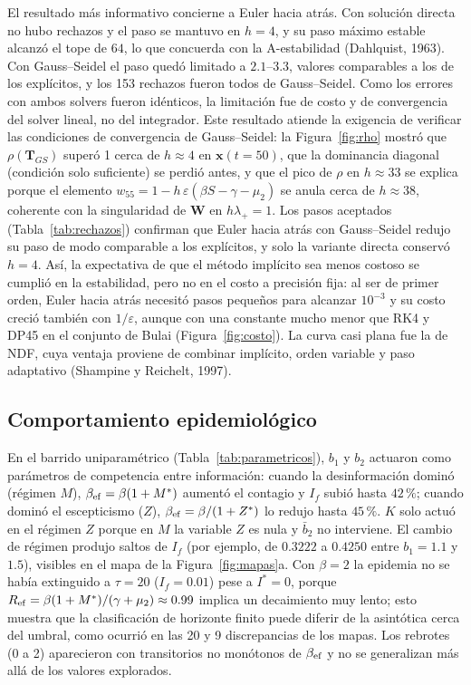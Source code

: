 El resultado más informativo concierne a Euler hacia atrás. Con solución directa no hubo rechazos y el paso se mantuvo en $h=4$, y su paso máximo estable alcanzó el tope de $64$, lo que concuerda con la A-estabilidad (Dahlquist, 1963). Con Gauss--Seidel el paso quedó limitado a $2.1$--$3.3$, valores comparables a los de los explícitos, y los 153 rechazos fueron todos de Gauss--Seidel. Como los errores con ambos solvers fueron idénticos, la limitación fue de costo y de convergencia del solver lineal, no del integrador. Este resultado atiende la exigencia de verificar las condiciones de convergencia de Gauss--Seidel: la Figura~\ref{fig:rho} mostró que $\rho(\mathbf T_{GS})$ superó 1 cerca de $h\approx4$ en $\mathbf x(t=50)$, que la dominancia diagonal (condición solo suficiente) se perdió antes, y que el pico de $\rho$ en $h\approx33$ se explica porque el elemento $w_{55}=1-h\,\varepsilon(\beta S-\gamma-\mu_2)$ se anula cerca de $h\approx38$, coherente con la singularidad de $\mathbf W$ en $h\lambda_+=1$. Los pasos aceptados (Tabla~\ref{tab:rechazos}) confirman que Euler hacia atrás con Gauss--Seidel redujo su paso de modo comparable a los explícitos, y solo la variante directa conservó $h=4$. Así, la expectativa de que el método implícito sea menos costoso se cumplió en la estabilidad, pero no en el costo a precisión fija: al ser de primer orden, Euler hacia atrás necesitó pasos pequeños para alcanzar $10^{-3}$ y su costo creció también con $1/\varepsilon$, aunque con una constante mucho menor que RK4 y DP45 en el conjunto de Bulai (Figura~\ref{fig:costo}). La curva casi plana fue la de NDF, cuya ventaja proviene de combinar implícito, orden variable y paso adaptativo (Shampine y Reichelt, 1997).

\subsection{Comportamiento epidemiológico}
En el barrido uniparamétrico (Tabla~\ref{tab:parametricos}), $b_1$ y $b_2$ actuaron como parámetros de competencia entre información: cuando la desinformación dominó (régimen $M$), $\beta_{\rm ef}=\beta(1+M^*)$ aumentó el contagio y $I_f$ subió hasta $42\,\%$; cuando dominó el escepticismo ($Z$), $\beta_{\rm ef}=\beta/(1+Z^*)$ lo redujo hasta $45\,\%$. $K$ solo actuó en el régimen $Z$ porque en $M$ la variable $Z$ es nula y $\bar b_2$ no interviene. El cambio de régimen produjo saltos de $I_f$ (por ejemplo, de $0.3222$ a $0.4250$ entre $b_1=1.1$ y $1.5$), visibles en el mapa de la Figura~\ref{fig:mapas}a. Con $\beta=2$ la epidemia no se había extinguido a $\tau=20$ ($I_f=0.01$) pese a $I^*=0$, porque $R_{\rm ef}=\beta(1+M^*)/(\gamma+\mu_2)\approx0.99$ implica un decaimiento muy lento; esto muestra que la clasificación de horizonte finito puede diferir de la asintótica cerca del umbral, como ocurrió en las 20 y 9 discrepancias de los mapas. Los rebrotes (0 a 2) aparecieron con transitorios no monótonos de $\beta_{\rm ef}$ y no se generalizan más allá de los valores explorados.

